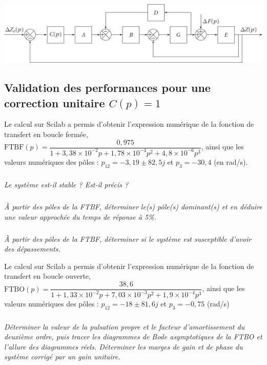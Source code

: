 \documentclass[10pt,fleqn]{article} %
\begin{document}
\begin{multicols}{2}
\begin{center}
\includegraphics[width=\linewidth]{images/fig_04}
\end{center}

\subsection*{Validation des performances pour une correction unitaire $C(p) = 1$}

Le calcul sur Scilab a permis d’obtenir l’expression numérique de la fonction de transfert en
boucle fermée, $\text{FTBF}(p) = \dfrac{0,975}{1+3,38\times 10^{-2}p+1,78\times 10^{-4}p^2+4,8\times 10^{-6}p^3}$, ainsi que les valeurs numériques des pôles : $p_{12}=-3,19 \pm 82,5 j$ et $p_3 = -30,4$ (en rad/s).

\subparagraph{}\textit{Le système est-il stable ? Est-il précis ?}
\ifprof
\begin{corrige}
\end{corrige}
\else
\fi


\subparagraph{}\textit{À partir des pôles de la FTBF, déterminer le(s) pôle(s) dominant(s) et en déduire une valeur
approchée du temps de réponse à 5\%.}
\ifprof
\begin{corrige}
\end{corrige}
\else
\fi


\subparagraph{}\textit{À partir des pôles de la FTBF, déterminer si le système est susceptible d’avoir des dépassements.}
\ifprof
\begin{corrige}
\end{corrige}
\else
\fi

Le calcul sur Scilab a permis d’obtenir l’expression numérique de la fonction de transfert en boucle
ouverte, $\text{FTBO}(p) = \dfrac{38,6}{1+1,33\times 10^{-2}p+7,03\times 10^{-3}p^2+1,9\times 10^{-4}p^3}$, ainsi que les valeurs numériques des pôles : $p_{12}=-18 \pm 81,6 j$ et $p_3 = -0,75$ (rad/s)

\subparagraph{}\textit{Déterminer la valeur de la pulsation propre et le facteur d’amortissement du deuxième ordre,
puis tracer les diagrammes de Bode asymptotiques de la FTBO et l’allure des diagrammes
réels. Déterminer les marges de gain et de phase du système corrigé par un gain unitaire.}
\ifprof
\begin{corrige}
\end{corrige}
\else
\fi




\end{multicols}
\end{document}
